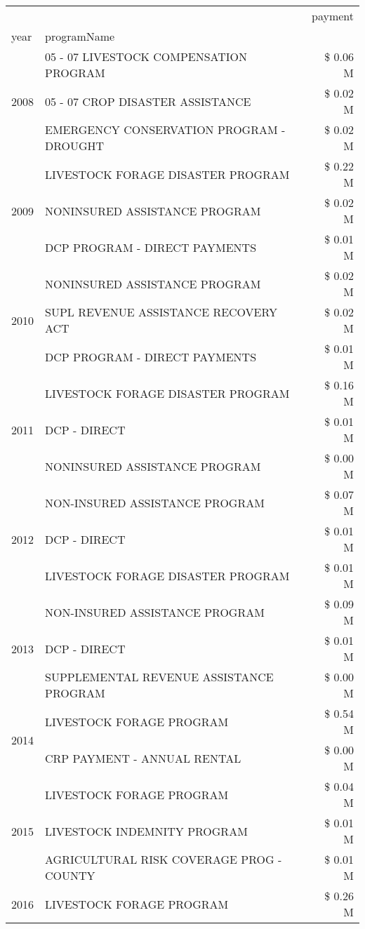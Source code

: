 \begin{tabular}{llr}
\toprule
 &  & payment \\
year & programName &  \\
\midrule
\multirow[t]{3}{*}{2008} & 05 - 07 LIVESTOCK COMPENSATION PROGRAM & \$ 0.06 M \\
 & 05 - 07 CROP DISASTER ASSISTANCE & \$ 0.02 M \\
 & EMERGENCY CONSERVATION PROGRAM - DROUGHT & \$ 0.02 M \\
\cline{1-3}
\multirow[t]{3}{*}{2009} & LIVESTOCK FORAGE DISASTER  PROGRAM & \$ 0.22 M \\
 & NONINSURED ASSISTANCE PROGRAM & \$ 0.02 M \\
 & DCP PROGRAM - DIRECT PAYMENTS & \$ 0.01 M \\
\cline{1-3}
\multirow[t]{3}{*}{2010} & NONINSURED ASSISTANCE PROGRAM & \$ 0.02 M \\
 & SUPL REVENUE ASSISTANCE RECOVERY ACT & \$ 0.02 M \\
 & DCP PROGRAM - DIRECT PAYMENTS & \$ 0.01 M \\
\cline{1-3}
\multirow[t]{3}{*}{2011} & LIVESTOCK FORAGE DISASTER PROGRAM & \$ 0.16 M \\
 & DCP - DIRECT & \$ 0.01 M \\
 & NONINSURED ASSISTANCE PROGRAM & \$ 0.00 M \\
\cline{1-3}
\multirow[t]{3}{*}{2012} & NON-INSURED ASSISTANCE PROGRAM & \$ 0.07 M \\
 & DCP - DIRECT & \$ 0.01 M \\
 & LIVESTOCK FORAGE DISASTER PROGRAM & \$ 0.01 M \\
\cline{1-3}
\multirow[t]{3}{*}{2013} & NON-INSURED ASSISTANCE PROGRAM & \$ 0.09 M \\
 & DCP - DIRECT & \$ 0.01 M \\
 & SUPPLEMENTAL REVENUE ASSISTANCE PROGRAM & \$ 0.00 M \\
\cline{1-3}
\multirow[t]{2}{*}{2014} & LIVESTOCK FORAGE PROGRAM & \$ 0.54 M \\
 & CRP PAYMENT - ANNUAL RENTAL & \$ 0.00 M \\
\cline{1-3}
\multirow[t]{3}{*}{2015} & LIVESTOCK FORAGE PROGRAM & \$ 0.04 M \\
 & LIVESTOCK INDEMNITY PROGRAM & \$ 0.01 M \\
 & AGRICULTURAL RISK COVERAGE PROG - COUNTY & \$ 0.01 M \\
\cline{1-3}
\multirow[t]{3}{*}{2016} & LIVESTOCK FORAGE PROGRAM                      & \$ 0.26 M \\

\end{tabular}
